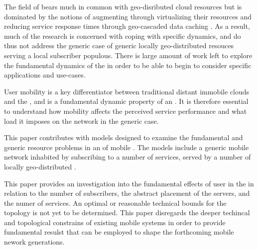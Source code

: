 The field of \xcloud bears much in common with geo-disributed cloud resources but is dominated by the notions of augmenting \ues through virtualizing their resources \cite{6563280} and reducing service response times through geo-cascaded data caching \cite{1437087,ericsson_akami}. As a result, much of the research is concerned with coping with specific dynamics, and do thus not address the generic case of generic locally geo-distributed resouces serving a local subscriber populous. There is large amount of work left to explore the fundamental dynamics of the \xcloud in order to be able to begin to consider specific applications and use-cases.

User mobility is a key differentiator between traditional distant immobile clouds and the \xcloud, and is a fundamental dynamic property of an \xcloud. It is therefore essential to understand how \ue mobility affects the perceived service performance and what load it imposes on the network in the generic case.

This paper contributes with models designed to examine the fundamental and generic resource problems in an \xcloud of mobile \ues. The models include a generic mobile network inhabited by \ues subscribing to a number of services, served by a number of locally geo-distributed \dcs.

This paper provides an investigation into the fundamental effects of user \ue in the \xcloud in relation to the number of subscribers, the abstract placement of the servers, and the numer of services. An optimal or reasonable technical bounds for the \xcloud topology is not yet to be determined. This paper disregards the deeper techincal and topological constrains of existing mobile systems in order to provide fundamental resulst that can be employed to shape the forthcoming mobile nework generations.